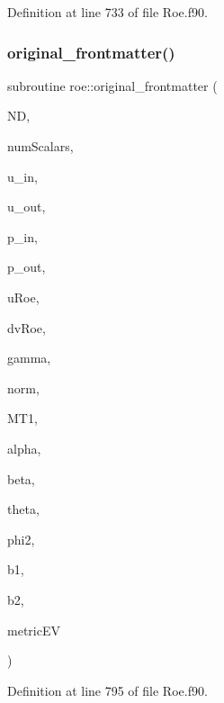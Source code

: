 Definition at line 733 of file Roe.\+f90.

\hypertarget{namespaceroe_a0c1152e75e536386090e98caedc622c2}{}\label{namespaceroe_a0c1152e75e536386090e98caedc622c2} 
\subsubsection{\texorpdfstring{original\+\_\+frontmatter()}{original\_frontmatter()}}
{\footnotesize\ttfamily subroutine roe\+::original\+\_\+frontmatter (\begin{DoxyParamCaption}\item[{integer(4)}]{ND,  }\item[{integer(4)}]{num\+Scalars,  }\item[{real(8), dimension(\+:), pointer}]{u\+\_\+in,  }\item[{real(8), dimension(\+:), pointer}]{u\+\_\+out,  }\item[{real(8)}]{p\+\_\+in,  }\item[{real(8)}]{p\+\_\+out,  }\item[{real(8), dimension(nd+2+numscalars)}]{u\+Roe,  }\item[{real(8), dimension(nd+2)}]{dv\+Roe,  }\item[{real(8)}]{gamma,  }\item[{real(8), dimension(\+:), pointer}]{norm,  }\item[{real(8), dimension(\+:), pointer}]{M\+T1,  }\item[{real(8)}]{alpha,  }\item[{real(8)}]{beta,  }\item[{real(8)}]{theta,  }\item[{real(8)}]{phi2,  }\item[{real(8)}]{b1,  }\item[{real(8)}]{b2,  }\item[{real(8), dimension(\+:), pointer}]{metric\+EV }\end{DoxyParamCaption})}



Definition at line 795 of file Roe.\+f90.

\hypertarget{namespaceroe_a98a581399f474ceddad29a35b54824b7}{}\label{namespaceroe_a98a581399f474ceddad29a35b54824b7} 
